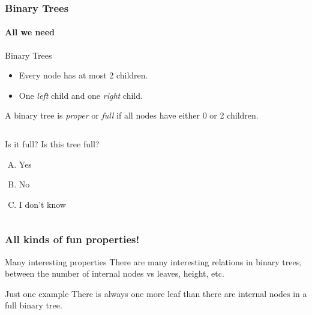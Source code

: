 \begin{frame}
	\frametitle{Binary Trees}
	\framesubtitle{All we need}

		\begin{block}{Binary Trees}
			\begin{itemize}
				\item Every node has at most 2 children.
					\pause
				\item One \textit{left} child and one \textit{right} child.
			\end{itemize}
		\pause
		A binary tree is \textit{proper} or \textit{full} if all nodes have either 0 or 2 children.
		\end{block}	

		\pause
		\begin{columns}
				
				
			\begin{block}{Is it full?}
				Is this tree full?
				\begin{enumerate}[A.]
					\item Yes
					\item No
					\item I don't know
				\end{enumerate}
			\end{block}
		\end{columns}
\end{frame}

\begin{frame}
	\frametitle{All kinds of fun properties!}
	
		\begin{block}{Many interesting properties}
			There are many interesting relations in binary trees, between the number of internal nodes vs leaves, height, etc.	
		\end{block}	
		\pause
		\begin{block}{Just one example}
			There is always one more leaf than there are internal nodes in a full binary tree.
		\end{block}	
\end{frame}

